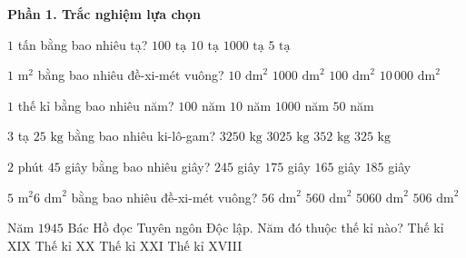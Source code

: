 \textbf{Phần 1. Trắc nghiệm lựa chọn}

\begin{ex} %
$1$ tấn bằng bao nhiêu tạ?
\choice
{$100\text{ tạ}$}
{\True $10\text{ tạ}$}
{$1000\text{ tạ}$}
{$5\text{ tạ}$}
\end{ex}

\begin{ex} %
$1\text{ m}^2$ bằng bao nhiêu đề-xi-mét vuông?
\choice
{$10\text{ dm}^2$}
{$1000\text{ dm}^2$}
{\True $100\text{ dm}^2$}
{$10\,000\text{ dm}^2$}
\end{ex}

\begin{ex} %
$1$ thế kỉ bằng bao nhiêu năm?
\choice
{\True $100$ năm}
{$10$ năm}
{$1000$ năm}
{$50$ năm}
\end{ex}

\begin{ex} %
$3$ tạ $25\text{ kg}$ bằng bao nhiêu ki-lô-gam?
\choice
{$3250\text{ kg}$}
{$3025\text{ kg}$}
{$352\text{ kg}$}
{\True $325\text{ kg}$}
\end{ex}

\begin{ex} %
$2$ phút $45$ giây bằng bao nhiêu giây?
\choice
{$245$ giây}
{$175$ giây}
{\True $165$ giây}
{$185$ giây}
\end{ex}

\begin{ex} %
$5\text{ m}^2 6\text{ dm}^2$ bằng bao nhiêu đề-xi-mét vuông?
\choice
{$56\text{ dm}^2$}
{$560\text{ dm}^2$}
{$5060\text{ dm}^2$}
{\True $506\text{ dm}^2$}
\end{ex}

\begin{ex} %
Năm $1945$ Bác Hồ đọc Tuyên ngôn Độc lập. Năm đó thuộc thế kỉ nào?
\choice
{Thế kỉ XIX}
{\True Thế kỉ XX}
{Thế kỉ XXI}
{Thế kỉ XVIII}
\end{ex}

